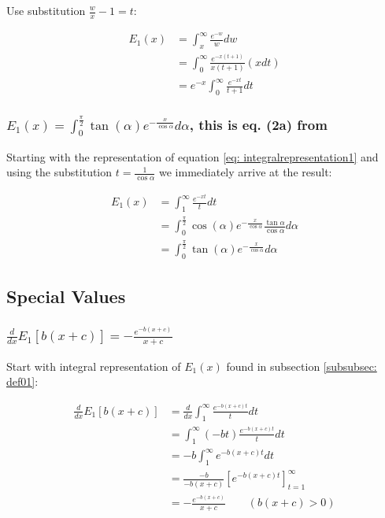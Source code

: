 \documentclass[bibliography=totocnumbered]{scrartcl}
\begin{document}
	Use substitution $\frac{w}{x}-1=t$:

	\begin{align}
		E_1\left(x\right)&=\int_{x}^{\infty}\frac{e^{-w}}{w}dw\\
		&=\int_{0}^{\infty}\frac{e^{-x\left(t+1\right)}}{x\left(t+1\right)}\left(xdt\right)\\
		&=e^{-x}\int_{0}^{\infty}\frac{e^{-xt}}{t+1}dt
	\end{align}

	\subsubsection[A integral representation involving integration over an angle]{$E_1\left(x\right)=\int_{0}^{\frac{\pi}{2}}\tan{\left(\alpha\right)}e^{-\frac{x}{\cos{\alpha}}}d\alpha$, this is eq. (2a) from \cite{boer1990calc}}

	Starting with the representation of equation \eqref{eq: integralrepresentation1} and using the substitution $t=\frac{1}{\cos\alpha}$ we immediately arrive at the result:

	\begin{align}
		E_1\left(x\right)&=\int_{1}^{\infty}\frac{e^{-xt}}{t}dt\\
		&=\int_{0}^{\frac{\pi}{2}}\cos{\left(\alpha\right)}e^{-\frac{x}{\cos\alpha}}\frac{\tan\alpha}{\cos\alpha}d\alpha\\
		&=\int_{0}^{\frac{\pi}{2}}\tan{\left(\alpha\right)}e^{-\frac{x}{\cos{\alpha}}}d\alpha
	\end{align}

	\subsection{Special Values}

	\subsubsection[A derivative of $E_1\left(x\right)$]{$\frac{d}{dx}E_1\left[b\left(x+c\right)\right]=-\frac{e^{-b\left(x+c\right)}}{x+c}$}
	\label{subsubsec: specval_deriv}

	Start with integral representation of $E_1\left(x\right)$ found in subsection \ref{subsubsec: def01}:

	\begin{align}
		\frac{d}{dx}E_1\left[b\left(x+c\right)\right]&=\frac{d}{dx}\int_{1}^{\infty}\frac{e^{-b\left(x+c\right)t}}{t}dt\\
		&=\int_{1}^{\infty}\left(-bt\right)\frac{e^{-b\left(x+c\right)t}}{t}dt\\
		&=-b\int_{1}^{\infty}e^{-b\left(x+c\right)t}dt\\
		&=\frac{-b}{-b\left(x+c\right)}\left[e^{-b\left(x+c\right)t}\right]^{\infty}_{t=1}\\
		&=-\frac{e^{-b\left(x+c\right)}}{x+c}\qquad\left(b\left(x+c\right)>0\right)
	\end{align}
\end{document}
